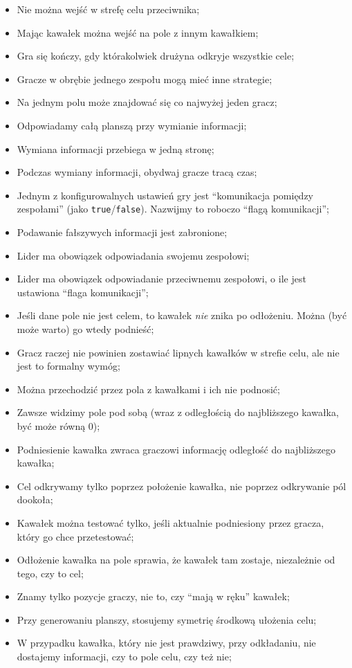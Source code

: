 \documentclass[a4paper]{article}
\begin{document}
\begin{itemize}
\item
  Nie można wejść w strefę celu przeciwnika;
\item
  Mając kawałek można wejść na pole z innym kawałkiem;
\item
  Gra się kończy, gdy którakolwiek drużyna odkryje wszystkie cele;
\item
  Gracze w obrębie jednego zespołu mogą mieć inne strategie;
\item
  Na jednym polu może znajdować się co najwyżej jeden gracz;
\item
  Odpowiadamy całą planszą przy wymianie informacji;
\item
  Wymiana informacji przebiega w jedną stronę;
\item
  Podczas wymiany informacji, obydwaj gracze tracą czas;
\item
  Jednym z konfigurowalnych ustawień gry jest ``komunikacja pomiędzy zespołami'' (jako \texttt{true}/\texttt{false}). Nazwijmy to roboczo ``flagą komunikacji'';
\item
  Podawanie fałszywych informacji jest zabronione;
\item
  Lider ma obowiązek odpowiadania swojemu zespołowi;
\item
  Lider ma obowiązek odpowiadanie przeciwnemu zespołowi, o ile jest ustawiona ``flaga komunikacji'';
\item
  Jeśli dane pole nie jest celem, to kawałek \emph{nie} znika po odłożeniu. Można (być może warto) go wtedy podnieść;
\item
  Gracz raczej nie powinien zostawiać lipnych kawałków w strefie celu, ale nie jest to formalny wymóg;
\item
  Można przechodzić przez pola z kawałkami i ich nie podnosić;
\item
  Zawsze widzimy pole pod sobą (wraz z odległością do najbliższego kawałka, być może równą 0);
\item
  Podniesienie kawałka zwraca graczowi informację odległość do najbliższego kawałka;
\item
  Cel odkrywamy tylko poprzez położenie kawałka, nie poprzez odkrywanie pól dookoła;
\item
  Kawałek można testować tylko, jeśli aktualnie podniesiony przez gracza, który go chce przetestować;
\item
  Odłożenie kawałka na pole sprawia, że kawałek tam zostaje, niezależnie od tego, czy to cel;
\item
  Znamy tylko pozycje graczy, nie to, czy ``mają w ręku'' kawałek;
\item
  Przy generowaniu planszy, stosujemy symetrię środkową ułożenia celu;
\item
  W przypadku kawałka, który nie jest prawdziwy, przy odkładaniu, nie dostajemy informacji, czy to pole celu, czy też nie;


\end{itemize}
\end{document}
